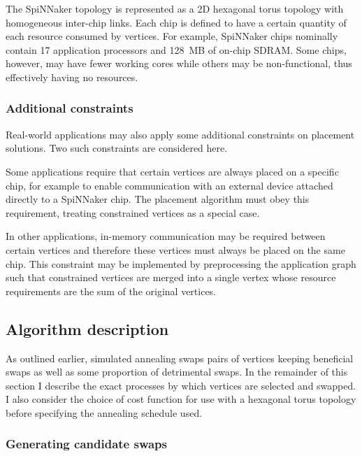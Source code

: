 			The SpiNNaker topology is represented as a 2D hexagonal torus topology
			with homogeneous inter-chip links. Each chip is defined to have a certain
			quantity of each resource consumed by vertices. For example, SpiNNaker
			chips nominally contain 17 application processors and 128~MB of on-chip
			SDRAM. Some chips, however, may have fewer working cores while others may
			be non-functional, thus effectively having no resources.
			
			\subsubsection{Additional constraints}
				
				Real-world applications may also apply some additional constraints on
				placement solutions. Two such constraints are considered here.
				
				Some applications require that certain vertices are always placed on a
				specific chip, for example to enable communication with an external
				device attached directly to a SpiNNaker chip. The placement algorithm
				must obey this requirement, treating constrained vertices as a
				special case.
				
				In other applications, in-memory communication may be required between
				certain vertices and therefore these vertices must always be placed on
				the same chip. This constraint may be implemented by preprocessing the
				application graph such that constrained vertices are merged into a
				single vertex whose resource requirements are the sum of the original
				vertices.
		
		\subsection{Algorithm description}
			
			As outlined earlier, simulated annealing swaps pairs of vertices keeping
			beneficial swaps as well as some proportion of detrimental swaps. In the
			remainder of this section I describe the exact processes by which
			vertices are selected and swapped. I also consider the choice of cost
			function for use with a hexagonal torus topology before specifying the
			annealing schedule used.
		
			\subsubsection{Generating candidate swaps}
				
